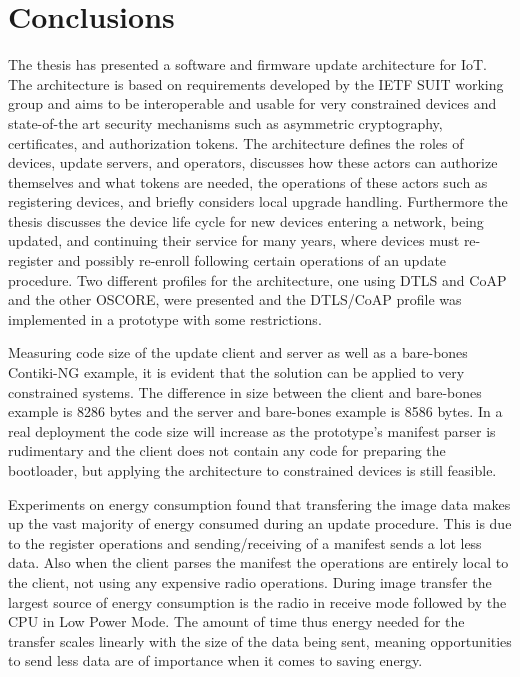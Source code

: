 \documentclass[0-thesis.tex]{subfiles}
\begin{document}
\section{Conclusions}
\label{sec:Conclusions}
The thesis has presented a software and firmware update architecture for IoT. The
architecture is based on requirements developed by the IETF SUIT working group and aims to
be interoperable and usable for very constrained devices and state-of-the art security
mechanisms such as asymmetric cryptography, certificates, and authorization tokens. The
architecture defines the roles of devices, update servers, and operators, discusses how
these actors can authorize themselves and what tokens are needed, the operations of these
actors such as registering devices, and briefly considers local upgrade handling.
Furthermore the thesis discusses the device life cycle for new devices entering a network,
being updated, and continuing their service for many years, where devices must re-register
and possibly re-enroll following certain operations of an update procedure. Two different
profiles for the architecture, one using DTLS and CoAP and the other OSCORE, were
presented and the DTLS/CoAP profile was implemented in a prototype with some restrictions.

Measuring code size of the update client and server as well as a bare-bones Contiki-NG
example, it is evident that the solution can be applied to very constrained systems. The
difference in size between the client and bare-bones example is 8286 bytes and the server
and bare-bones example is 8586 bytes. In a real deployment the code size will increase as
the prototype's manifest parser is rudimentary and the client does not contain any code
for preparing the bootloader, but applying the architecture to constrained devices is
still feasible.

Experiments on energy consumption found that transfering the image data makes up the vast
majority of energy consumed during an update procedure. This is due to the register
operations and sending/receiving of a manifest sends a lot less data. Also when the client
parses the manifest the operations are entirely local to the client, not using any
expensive radio operations. During image transfer the largest source of energy consumption
is the radio in receive mode followed by the CPU in Low Power Mode. The amount of time
thus energy needed for the transfer scales linearly with the size of the data being sent,
meaning opportunities to send less data are of importance when it comes to saving energy.
\end{document}

